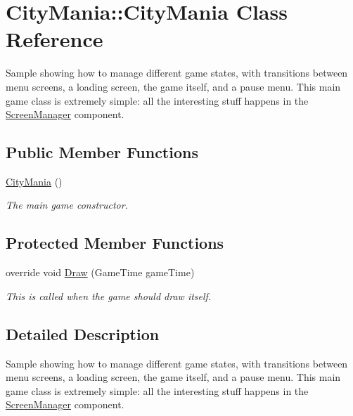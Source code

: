 \hypertarget{classCityMania_1_1CityMania}{
\section{CityMania::CityMania Class Reference}
\label{classCityMania_1_1CityMania}
}


Sample showing how to manage different game states, with transitions between menu screens, a loading screen, the game itself, and a pause menu. This main game class is extremely simple: all the interesting stuff happens in the \hyperlink{classCityMania_1_1ScreenManager}{ScreenManager} component.  
\subsection*{Public Member Functions}
\begin{DoxyCompactItemize}
\item 
\hyperlink{classCityMania_1_1CityMania_ac7ae0c2da8da3eedb375fc38e83cd77b}{CityMania} ()
\begin{DoxyCompactList}\small\item\em The main game constructor. \item\end{DoxyCompactList}\end{DoxyCompactItemize}
\subsection*{Protected Member Functions}
\begin{DoxyCompactItemize}
\item 
override void \hyperlink{classCityMania_1_1CityMania_af68340ca372af124db302497f359dbbc}{Draw} (GameTime gameTime)
\begin{DoxyCompactList}\small\item\em This is called when the game should draw itself. \item\end{DoxyCompactList}\end{DoxyCompactItemize}


\subsection{Detailed Description}
Sample showing how to manage different game states, with transitions between menu screens, a loading screen, the game itself, and a pause menu. This main game class is extremely simple: all the interesting stuff happens in the \hyperlink{classCityMania_1_1ScreenManager}{ScreenManager} component. 

